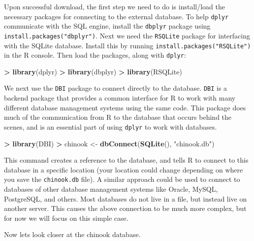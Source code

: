 \documentclass[
]{krantz}
\makeatletter
\newenvironment{Shaded}{\begin{snugshade}}{\end{snugshade}}
\newcommand{\KeywordTok}[1]{\textcolor[rgb]{0.27,0.27,0.27}{\textbf{#1}}}
\newcommand{\NormalTok}[1]{#1}
\newcommand{\OperatorTok}[1]{\textcolor[rgb]{0.43,0.43,0.43}{\textbf{#1}}}
\newcommand{\StringTok}[1]{\textcolor[rgb]{0.5,0.5,0.5}{#1}}
\newenvironment{kframe}{%
\medskip{}
\setlength{\fboxsep}{.8em}
 \def\at@end@of@kframe{}%
 \ifinner\ifhmode%
  \def\at@end@of@kframe{\end{minipage}}%
  \begin{minipage}{\columnwidth}%
 \fi\fi%
 \def\FrameCommand##1{\hskip\@totalleftmargin \hskip-\fboxsep
 \colorbox{shadecolor}{##1}\hskip-\fboxsep
     \hskip-\linewidth \hskip-\@totalleftmargin \hskip\columnwidth}%
 \MakeFramed {\advance\hsize-\width
   \@totalleftmargin\z@ \linewidth\hsize
   \@setminipage}}%
 {\par\unskip\endMakeFramed%
 \at@end@of@kframe}
\renewenvironment{Shaded}{\begin{kframe}}{\end{kframe}}
\makeatother
\begin{document}
Upon successful download, the first step we need to do is install/load the necessary packages for connecting to the external database. To help \texttt{dplyr} communicate with the SQL engine, install the \texttt{dbplyr} package using \texttt{install.packages("dbplyr")}. Next we need the \texttt{RSQLite} package for interfacing with the SQLite database. Install this by running \texttt{install.packages("RSQLite")} in the R console. Then load the packages, along with \texttt{dplyr}:

\begin{Shaded}
\begin{Highlighting}[]
\OperatorTok{\textgreater{}}\StringTok{ }\KeywordTok{library}\NormalTok{(dplyr)}
\OperatorTok{\textgreater{}}\StringTok{ }\KeywordTok{library}\NormalTok{(dbplyr)}
\OperatorTok{\textgreater{}}\StringTok{ }\KeywordTok{library}\NormalTok{(RSQLite)}
\end{Highlighting}
\end{Shaded}

We next use the \texttt{DBI} package to connect directly to the database. \texttt{DBI} is a backend package that provides a common interface for R to work with many different database management systems using the same code. This package does much of the communication from R to the database that occurs behind the scenes, and is an essential part of using \texttt{dplyr} to work with databases.

\begin{Shaded}
\begin{Highlighting}[]
\OperatorTok{\textgreater{}}\StringTok{ }\KeywordTok{library}\NormalTok{(DBI)}
\OperatorTok{\textgreater{}}\StringTok{ }\NormalTok{chinook \textless{}{-}}\StringTok{ }\KeywordTok{dbConnect}\NormalTok{(}\KeywordTok{SQLite}\NormalTok{(), }\StringTok{"chinook.db"}\NormalTok{)}
\end{Highlighting}
\end{Shaded}

This command creates a reference to the database, and tells R to connect to this database in a specific location (your location could change depending on where you save the \texttt{chinook.db} file). A similar approach could be used to connect to databases of other database management systems like Oracle, MySQL, PostgreSQL, and others. Most databases do not live in a file, but instead live on another server. This causes the above connection to be much more complex, but for now we will focus on this simple case.

Now lets look closer at the chinook database.
\end{document}
